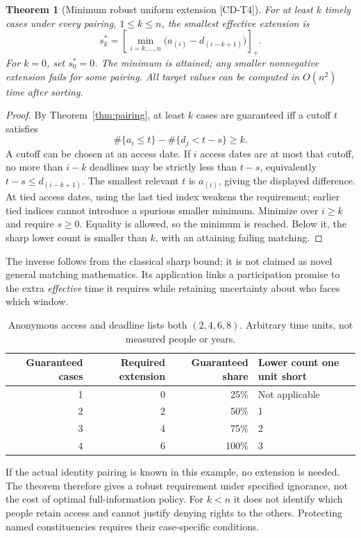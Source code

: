 \documentclass[11pt,a4paper]{article}
\newtheorem{theorem}{Theorem}
\theoremstyle{definition}\newtheorem{definition}{Definition}
\newcommand{\tagid}[1]{\textnormal{\textsf{[#1]}}}
\begin{document}
\begin{theorem}[Minimum robust uniform extension \tagid{CD-T4}]
\label{thm:extension}
For at least $k$ timely cases under every pairing, $1\le k\le n$, the smallest effective extension is
\begin{equation}
\boxed{s_k^*=\left[\min_{i=k,\ldots,n}\big(a_{(i)}-d_{(i-k+1)}\big)\right]_+.}
\label{eq:extension}
\end{equation}
For $k=0$, set $s_0^*=0$. The minimum is attained; any smaller nonnegative extension fails for some pairing. All target values can be computed in $O(n^2)$ time after sorting.
\end{theorem}
\begin{proof}
By Theorem~\ref{thm:pairing}, at least $k$ cases are guaranteed iff a cutoff $t$ satisfies
\[
\#\{a_i\le t\}-\#\{d_j<t-s\}\ge k.
\]
A cutoff can be chosen at an access date. If $i$ access dates are at most that cutoff, no more than $i-k$ deadlines may be strictly less than $t-s$, equivalently $t-s\le d_{(i-k+1)}$. The smallest relevant $t$ is $a_{(i)}$, giving the displayed difference. At tied access dates, using the last tied index weakens the requirement; earlier tied indices cannot introduce a spurious smaller minimum. Minimize over $i\ge k$ and require $s\ge0$. Equality is allowed, so the minimum is reached. Below it, the sharp lower count is smaller than $k$, with an attaining failing matching.
\end{proof}
The inverse follows from the classical sharp bound; it is not claimed as novel general matching mathematics. Its application links a participation promise to the extra \emph{effective} time it requires while retaining uncertainty about who faces which window.

\begin{table}[ht]
\centering\small
\caption{Anonymous access and deadline lists both $(2,4,6,8)$. Arbitrary time units, not measured people or years.}
\label{tab:extension}
\begin{tabular}{@{}rrrl@{}}\toprule
Guaranteed cases & Required extension & Guaranteed share & Lower count one unit short\\\midrule
1&0&25\%&Not applicable\\
2&2&50\%&1\\
3&4&75\%&2\\
4&6&100\%&3\\\bottomrule
\end{tabular}
\end{table}
If the actual identity pairing is known in this example, no extension is needed. The theorem therefore gives a robust requirement under specified ignorance, not the cost of optimal full-information policy. For $k<n$ it does not identify which people retain access and cannot justify denying rights to the others. Protecting named constituencies requires their case-specific conditions.
\end{document}
